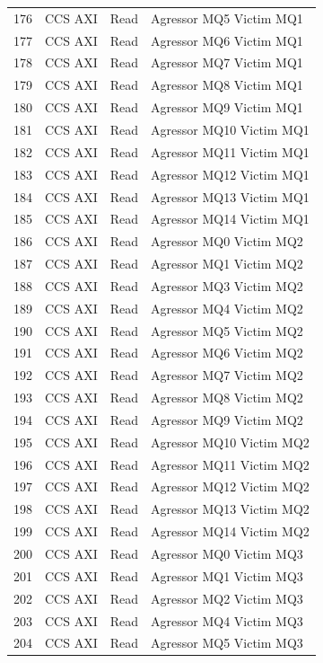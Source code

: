 \begin{center}
\begin{longtable}{|l|l|l|l|}
176 & CCS AXI & Read &  Agressor MQ5 Victim MQ1\\
177 & CCS AXI & Read &  Agressor MQ6 Victim MQ1\\
178 & CCS AXI & Read &  Agressor MQ7 Victim MQ1\\
179 & CCS AXI & Read &  Agressor MQ8 Victim MQ1\\
180 & CCS AXI & Read &  Agressor MQ9 Victim MQ1\\
181 & CCS AXI & Read &  Agressor MQ10 Victim MQ1\\
182 & CCS AXI & Read &  Agressor MQ11 Victim MQ1\\
183 & CCS AXI & Read &  Agressor MQ12 Victim MQ1\\
184 & CCS AXI & Read &  Agressor MQ13 Victim MQ1\\
185 & CCS AXI & Read &  Agressor MQ14 Victim MQ1\\
186 & CCS AXI & Read &  Agressor MQ0 Victim MQ2\\
187 & CCS AXI & Read &  Agressor MQ1 Victim MQ2\\
188 & CCS AXI & Read &  Agressor MQ3 Victim MQ2\\
189 & CCS AXI & Read &  Agressor MQ4 Victim MQ2\\
190 & CCS AXI & Read &  Agressor MQ5 Victim MQ2\\
191 & CCS AXI & Read &  Agressor MQ6 Victim MQ2\\
192 & CCS AXI & Read &  Agressor MQ7 Victim MQ2\\
193 & CCS AXI & Read &  Agressor MQ8 Victim MQ2\\
194 & CCS AXI & Read &  Agressor MQ9 Victim MQ2\\
195 & CCS AXI & Read &  Agressor MQ10 Victim MQ2\\
196 & CCS AXI & Read &  Agressor MQ11 Victim MQ2\\
197 & CCS AXI & Read &  Agressor MQ12 Victim MQ2\\
198 & CCS AXI & Read &  Agressor MQ13 Victim MQ2\\
199 & CCS AXI & Read &  Agressor MQ14 Victim MQ2\\
200 & CCS AXI & Read &  Agressor MQ0 Victim MQ3\\
201 & CCS AXI & Read &  Agressor MQ1 Victim MQ3\\
202 & CCS AXI & Read &  Agressor MQ2 Victim MQ3\\
203 & CCS AXI & Read &  Agressor MQ4 Victim MQ3\\
204 & CCS AXI & Read &  Agressor MQ5 Victim MQ3\\

\end{longtable}
\end{center}
